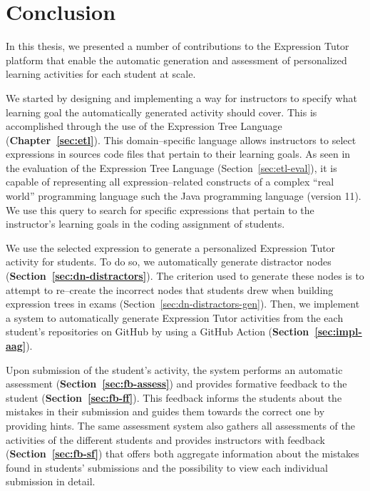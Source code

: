 \chapter{Conclusion}

\begin{chapterBody}

In this thesis, we presented a number of contributions to the Expression
Tutor platform that enable the automatic generation and assessment of 
personalized learning activities for each student at scale.

We started by designing and implementing a way for instructors to specify what
learning goal the automatically generated activity should cover. This is
accomplished through the use of the Expression Tree Language
(\textbf{Chapter~\ref{sec:etl}}). This domain–specific language allows
instructors to  select expressions in sources code files that pertain to their
learning goals.
As seen in the evaluation of the Expression Tree Language
(Section~\ref{sec:etl-eval}), it is capable of representing all
expression–related constructs of a complex ``real world'' programming language
such the Java programming language (version 11).
We use this query to search for specific expressions that pertain to the
instructor's learning goals in the coding assignment of students.

We use the selected expression to generate a personalized Expression Tutor
activity for students. To do so, we automatically generate distractor nodes
(\textbf{Section~\ref{sec:dn-distractors}}).
The criterion used to generate these nodes is to attempt to re–create the
incorrect nodes that students drew when building expression trees in exams
(Section~\ref{sec:dn-distractors-gen}).
Then, we implement a system to automatically generate Expression Tutor
activities from the each student's repositories on GitHub by using a GitHub
Action (\textbf{Section~\ref{sec:impl-aag}}).

Upon submission of the student's activity, the system performs an
automatic assessment  \hfill\break
(\textbf{Section~\ref{sec:fb-assess}}) and provides formative
feedback to the student (\textbf{Section~\ref{sec:fb-ff}}).
This feedback informs the students about the mistakes in their
submission and guides them towards the correct one by providing hints.
The same assessment system also gathers all assessments of the activities of
the different students and provides instructors with feedback 
(\textbf{Section~\ref{sec:fb-sf}}) that offers both aggregate information about
the mistakes found in students' submissions and the possibility to view each
individual submission in detail.


\end{chapterBody}
